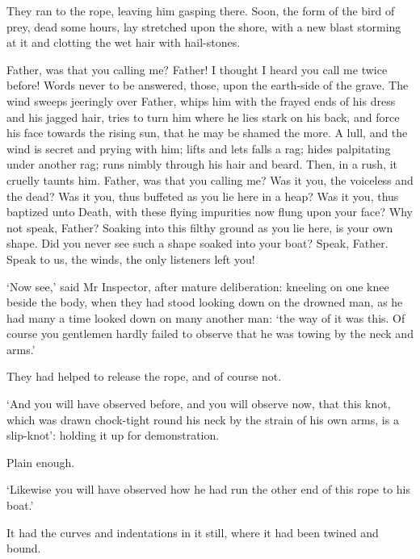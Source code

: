 They ran to the rope, leaving him gasping there. Soon, the form of the
bird of prey, dead some hours, lay stretched upon the shore, with a new
blast storming at it and clotting the wet hair with hail-stones.

Father, was that you calling me? Father! I thought I heard you call me
twice before! Words never to be answered, those, upon the earth-side
of the grave. The wind sweeps jeeringly over Father, whips him with the
frayed ends of his dress and his jagged hair, tries to turn him where he
lies stark on his back, and force his face towards the rising sun, that
he may be shamed the more. A lull, and the wind is secret and prying
with him; lifts and lets falls a rag; hides palpitating under another
rag; runs nimbly through his hair and beard. Then, in a rush, it cruelly
taunts him. Father, was that you calling me? Was it you, the voiceless
and the dead? Was it you, thus buffeted as you lie here in a heap? Was
it you, thus baptized unto Death, with these flying impurities now flung
upon your face? Why not speak, Father? Soaking into this filthy ground
as you lie here, is your own shape. Did you never see such a shape
soaked into your boat? Speak, Father. Speak to us, the winds, the only
listeners left you!

‘Now see,’ said Mr Inspector, after mature deliberation: kneeling on one
knee beside the body, when they had stood looking down on the drowned
man, as he had many a time looked down on many another man: ‘the way of
it was this. Of course you gentlemen hardly failed to observe that he
was towing by the neck and arms.’

They had helped to release the rope, and of course not.

‘And you will have observed before, and you will observe now, that this
knot, which was drawn chock-tight round his neck by the strain of his
own arms, is a slip-knot’: holding it up for demonstration.

Plain enough.

‘Likewise you will have observed how he had run the other end of this
rope to his boat.’

It had the curves and indentations in it still, where it had been twined
and bound.

